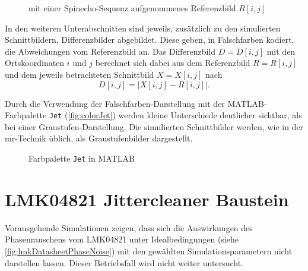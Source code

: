 \begin{figure}[H]
	\centering
	\caption[Referenzbild]{mit einer Spinecho-Sequenz aufgenommenes Referenzbild $R[i,j]$}
	\label{fig:R}
\end{figure}

In den weiteren Unterabschnitten sind jeweils, zusätzlich zu den simulierten Schnittbildern, Differenzbilder abgebildet. Diese geben, in Falschfarben kodiert, die Abweichungen vom Referenzbild an. Das Differenzbild $D=D[i,j]$ mit den Ortskoordinaten $i$ und $j$ berechnet sich dabei aus dem Referenzbild $R=R[i,j]$ und dem jeweils betrachteten Schnittbild $X=X[i,j]$ nach
\begin{equation}
	D[i,j]=\left| X[i,j]-R[i,j]\right|.
\end{equation}

Durch die Verwendung der Falschfarben-Darstellung mit der MATLAB-Farbpalette \texttt{Jet} (\autoref{fig:colorJet}) werden kleine Unterschiede deutlicher sichtbar, als bei einer Graustufen-Darstellung. Die simulierten Schnittbilder werden, wie in der \gls{mr}-Technik üblich, als Graustufenbilder dargestellt.

\begin{figure}[H]
	\centering
	\caption[]{Farbpalette \texttt{Jet} in MATLAB}
	\label{fig:colorJet}
\end{figure}




\clearpage
\section{LMK04821 Jittercleaner Baustein}
Vorausgehende Simulationen zeigen, dass sich die Auswirkungen des Phasenrauschens vom LMK04821 unter Idealbedingungen (siehe \autoref{fig:lmkDatasheetPhaseNoise}) mit den gewählten Simulationsparametern nicht darstellen lassen. Dieser Betriebsfall wird nicht weiter untersucht.

